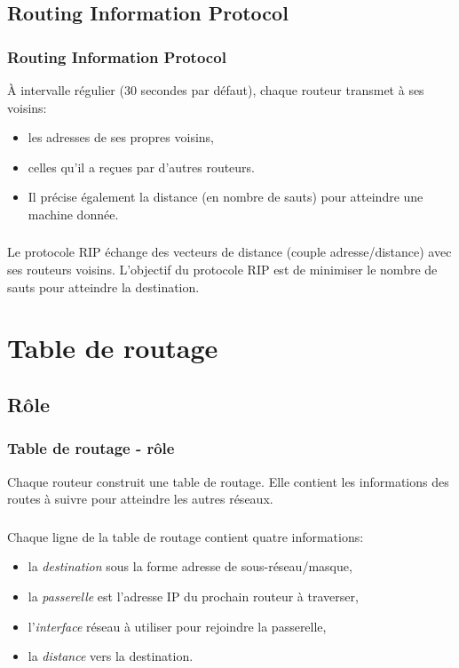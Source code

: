 \documentclass[svgnames,11pt]{beamer}
\begin{document}
\subsection{Routing Information Protocol}
\begin{frame}
    \frametitle{Routing Information Protocol}

    À intervalle régulier (30 secondes par défaut), chaque routeur transmet à ses voisins:
    \begin{itemize}
        \item<1-> les adresses de ses propres voisins,
        \item<2-> celles qu’il a reçues par d’autres routeurs.
        \item<3-> Il précise également la distance (en
        nombre de sauts) pour atteindre une machine donnée.
    \end{itemize}

\end{frame}
\begin{frame}
    \frametitle{}

    \begin{aretenir}[]
        Le protocole RIP échange des vecteurs de distance (couple adresse/distance) avec ses routeurs voisins. L’objectif du protocole RIP est de minimiser le nombre de sauts pour atteindre la destination.
    \end{aretenir}

\end{frame}
\section{Table de routage}
\subsection{Rôle}
\begin{frame}
    \frametitle{Table de routage - rôle}
\begin{center}
        Chaque routeur construit une table de routage. Elle contient les informations des routes à suivre pour atteindre les autres réseaux.
\end{center}
    

\end{frame}
\begin{frame}
    \frametitle{}

    Chaque ligne de la table de routage contient quatre informations:
\begin{itemize}
    \item<1-> la \emph{destination} sous la forme adresse de sous-réseau/masque,
    \item<2-> la \emph{passerelle} est l'adresse IP du prochain routeur à traverser,
    \item<3-> l'\emph{interface} réseau à utiliser pour rejoindre la passerelle,
    \item<4-> la \emph{distance} vers la destination.
\end{itemize}

\end{frame}
\end{document}
